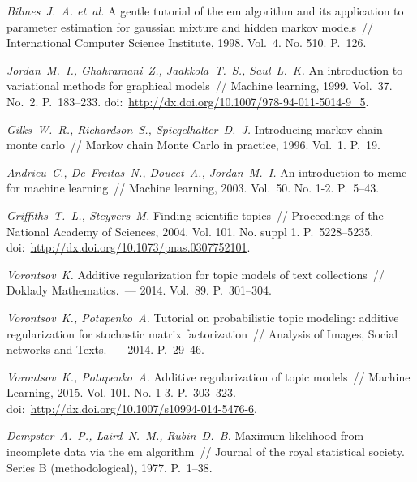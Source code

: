 \documentclass[12pt, twoside]{article}
\begin{document}
\begin{thebibliography}{10}
\emph{Bilmes~J.~A. et~al.}
A gentle tutorial of the em algorithm and its application to parameter
  estimation for gaussian mixture and hidden markov models~//
International Computer Science Institute,
1998.
Vol.~4.
No. 510.
P.~126.

\emph{Jordan~M.~I., Ghahramani~Z., Jaakkola~T.~S., Saul~L.~K.}
An introduction to variational methods for graphical models~//
Machine learning,
1999.
Vol.~37.
No.~2.
P.~183--233.
doi:~\url{http://dx.doi.org/10.1007/978-94-011-5014-9_5}.

\emph{Gilks~W.~R., Richardson~S., Spiegelhalter~D.~J.}
Introducing markov chain monte carlo~//
Markov chain Monte Carlo in practice,
1996.
Vol.~1.
P.~19.

\emph{Andrieu~C., De~Freitas~N., Doucet~A., Jordan~M.~I.}
An introduction to mcmc for machine learning~//
Machine learning,
2003.
Vol.~50.
No. 1-2.
P.~5--43.

\emph{Griffiths~T.~L., Steyvers~M.}
Finding scientific topics~//
Proceedings of the National Academy of Sciences,
2004.
Vol. 101.
No. suppl 1.
P.~5228--5235.
doi:~\url{http://dx.doi.org/10.1073/pnas.0307752101}.

\emph{Vorontsov~K.}
Additive regularization for topic models of text collections~//
Doklady Mathematics.~---
2014.
Vol.~89.
P.~301--304.

\emph{Vorontsov~K., Potapenko~A.}
Tutorial on probabilistic topic modeling: additive regularization for
  stochastic matrix factorization~//
Analysis of Images, Social networks and Texts.~---
2014.
P.~29--46.

\emph{Vorontsov~K., Potapenko~A.}
Additive regularization of topic models~//
Machine Learning,
2015.
Vol. 101.
No. 1-3.
P.~303--323.
doi:~\url{http://dx.doi.org/10.1007/s10994-014-5476-6}.

\emph{Dempster~A.~P., Laird~N.~M., Rubin~D.~B.}
Maximum likelihood from incomplete data via the em algorithm~//
Journal of the royal statistical society. Series B (methodological),
1977.
P.~1--38.


\end{thebibliography}
\end{document}
